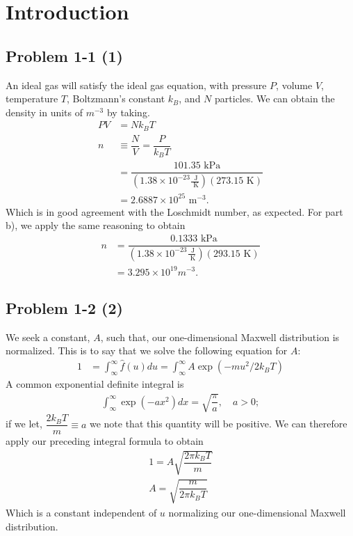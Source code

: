 \chapter{Introduction}
\label{ch:One}

\section*{Problem 1-1 (1)}
\label{sec:1-1}
An ideal gas will satisfy the ideal gas equation, with pressure \(P\), volume \(V\), temperature \(T\), Boltzmann's constant \(k_B\), and \(N\) particles. We can obtain the density in units of \(m^{-3}\) by taking.
\begin{align}
	PV &= Nk_BT \\
	n &\equiv \dfrac{N}{V} = \dfrac{P}{k_BT} \\
	  &= \dfrac{101.35\text{ kPa}}{(1.38\times10^{-23}\frac{\text{ J}}{\text{ K}})(273.15\text{ K})}\\
	  &= 2.6887\times10^{25}\text{ m}^{-3}.
\end{align}
Which is in good agreement with the Loschmidt number, as expected. 
For part b), we apply the same reasoning to obtain
\begin{align}
	n &= \dfrac{0.1333\text{ kPa}}{(1.38\times10^{-23}\frac{\text{ J}}{\text{ K}})(293.15\text{ K})}\\
	&= 3.295\times10^{19}m^{-3}.
\end{align}

\section*{Problem 1-2 (2)}
\label{sec:1-2}
We seek a constant, \(A\), such that, our one-dimensional Maxwell distribution is normalized. This is to say that we solve the following equation for \(A\):
\begin{align}
	1 &= \int_\infty^\infty \hat{f}(u)du = \int_\infty^\infty A \exp{(-mu^2/2k_BT)}
\end{align}
A common exponential definite integral is
\begin{align}
	\int_\infty^\infty \exp(-ax^2)dx = \sqrt{{\dfrac{\pi}{a}}}, \quad a > 0;
\end{align}
if we let, \(\dfrac{2k_BT}{m} \equiv a \) we note that this quantity will be positive. We can therefore apply our preceding integral formula to obtain
\begin{align}
	1 = A\sqrt{\dfrac{2\pi k_BT}{m}} \\
	A = \sqrt{\dfrac{m}{2\pi k_BT}}
\end{align}
Which is a constant independent of \(u\) normalizing our one-dimensional Maxwell distribution. 

